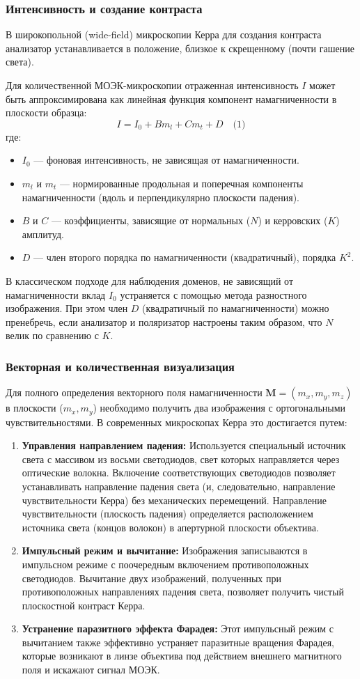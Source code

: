 \documentclass[12pt,a4paper]{article}
\numberwithin{equation}{section}
\begin{document}
\subsubsection{Интенсивность и создание контраста}
В широкопольной (wide-field) микроскопии Керра для создания контраста анализатор устанавливается в положение, близкое к скрещенному (почти гашение света).

Для количественной МОЭК-микроскопии отраженная интенсивность $I$ может быть аппроксимирована как линейная функция компонент намагниченности в плоскости образца:
$$
I = I_0 + Bm_l + Cm_t + D \quad \text{(1)}
$$
где:
\begin{itemize}
    \item $I_0$ — фоновая интенсивность, не зависящая от намагниченности.
    \item $m_l$ и $m_t$ — нормированные продольная и поперечная компоненты намагниченности (вдоль и перпендикулярно плоскости падения).
    \item $B$ и $C$ — коэффициенты, зависящие от нормальных ($N$) и керровских ($K$) амплитуд.
    \item $D$ — член второго порядка по намагниченности (квадратичный), порядка $K^2$.
\end{itemize}
В классическом подходе для наблюдения доменов, не зависящий от намагниченности вклад $I_0$ устраняется с помощью метода разностного изображения. При этом член $D$ (квадратичный по намагниченности) можно пренебречь, если анализатор и поляризатор настроены таким образом, что $N$ велик по сравнению с $K$.

\subsubsection{Векторная и количественная визуализация}
Для полного определения векторного поля намагниченности $\mathbf{M} = (m_x, m_y, m_z)$ в плоскости ($m_x, m_y$) необходимо получить два изображения с ортогональными чувствительностями. В современных микроскопах Керра это достигается путем:
\begin{enumerate}
    \item \textbf{Управления направлением падения:} Используется специальный источник света с массивом из восьми светодиодов, свет которых направляется через оптические волокна. Включение соответствующих светодиодов позволяет устанавливать направление падения света (и, следовательно, направление чувствительности Керра) без механических перемещений. Направление чувствительности (плоскость падения) определяется расположением источника света (концов волокон) в апертурной плоскости объектива.
    \item \textbf{Импульсный режим и вычитание:} Изображения записываются в импульсном режиме с поочередным включением противоположных светодиодов. Вычитание двух изображений, полученных при противоположных направлениях падения света, позволяет получить чистый плоскостной контраст Керра.
    \item \textbf{Устранение паразитного эффекта Фарадея:} Этот импульсный режим с вычитанием также эффективно устраняет паразитные вращения Фарадея, которые возникают в линзе объектива под действием внешнего магнитного поля и искажают сигнал МОЭК.
\end{enumerate}
\end{document}
